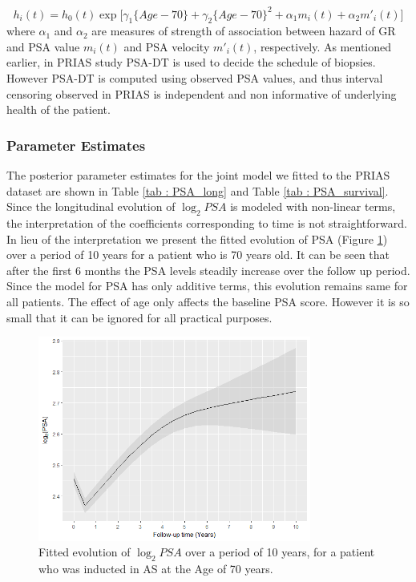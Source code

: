 \begin{equation}
\label{eq : hazard_prias}
h_i(t) = h_0(t) \exp\big[\gamma_1 \{Age-70\}  + \gamma_2 \{Age-70\}^2 + \alpha_1 m_i(t) + \alpha_2 m'_i(t)\big]
\end{equation}
where $\alpha_1$ and $\alpha_2$ are measures of strength of association between hazard of GR and PSA value $m_i(t)$ and PSA velocity $m'_i(t)$, respectively. As mentioned earlier, in PRIAS study PSA-DT is used to decide the schedule of biopsies. However PSA-DT is computed using observed PSA values, and thus interval censoring observed in PRIAS is independent and non informative of underlying health of the patient.

\subsubsection{Parameter Estimates}
\label{subsec : param_estimates_jm_fit_prias}
The posterior parameter estimates for the joint model we fitted to the PRIAS dataset are shown in Table \ref{tab : PSA_long} and Table \ref{tab : PSA_survival}. Since the longitudinal evolution of $\log_2 PSA$ is modeled with non-linear terms, the interpretation of the coefficients corresponding to time is not straightforward. In lieu of the interpretation we present the fitted evolution of PSA (Figure \ref{fig : fitted_trend_psa}) over a period of 10 years for a patient who is 70 years old. It can be seen that after the first 6 months the PSA levels steadily increase over the follow up period. Since the model for PSA has only additive terms, this evolution remains same for all patients. The effect of age only affects the baseline PSA score. However it is so small that it can be ignored for all practical purposes.\\

\begin{figure}[!htb]
	\centering
    \captionsetup{justification=centering}
	\includegraphics[width=0.8\textwidth]{images/fitted_trend_psa.png}
	\caption{Fitted evolution of $\log_2 PSA$ over a period of 10 years, for a patient who was inducted in AS at the Age of 70 years.}
	\label{fig : fitted_trend_psa}
\end{figure}

